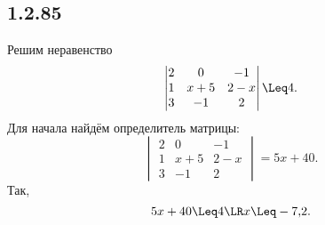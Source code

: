\subsection{1.2.85}

Решим неравенство
\[
\begin{vmatrix}
	2 & 0 & -1 \\
	1 & x+5 & 2-x \\
	3 & -1 & 2
\end{vmatrix}
\Leq4.
\]
Для начала найдём определитель матрицы:
\[
\begin{vmatrix}
	2 & 0 & -1 \\
	1 & x+5 & 2-x \\
	3 & -1 & 2
\end{vmatrix}
=5x+40.
\]
Так,
\[
5x+40\Leq4\LR x\Leq-7{,}2.
\]
